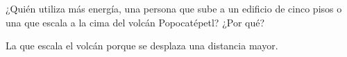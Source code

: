 ¿Quién utiliza más energía, una persona que sube a un edificio de cinco
pisos o una que escala a la cima del volcán Popocatépetl? ¿Por qué?


\begin{solutionbox}{2cm}
    La que escala el volcán porque se desplaza una distancia mayor.
\end{solutionbox}
